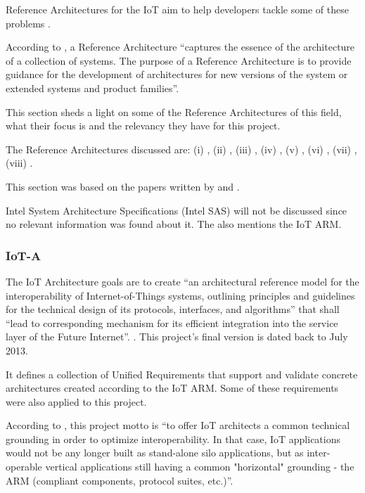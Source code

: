 Reference Architectures for the \gls{IoT} aim to help developers tackle some of these problems \parencite{weyrich2015reference}.

According to \cite{muller2008reference}, a Reference Architecture ``captures the essence of the architecture of a collection of systems. The purpose of a Reference Architecture is to provide guidance for the development of architectures for new versions of the system or extended systems and product families''.

This section sheds a light on some of the Reference Architectures of this field, what their focus is and the relevancy they have for this project.

The Reference Architectures discussed are: (i) , (ii) , (iii) , (iv) , (v) , (vi) , (vii) , (viii) .

This section was based on the papers written by \cite{Lynn2020} and \cite{DIAS2022100529}.

Intel System Architecture Specifications (Intel SAS) will not be discussed since no relevant information was found about it.
The  also mentions the \gls{IoT} \gls{ARM}.

\subsubsection{IoT-A}
\label{subsubsec:stateofart:arch:iota}

The IoT Architecture goals are to create ``an architectural reference model for the interoperability of Internet-of-Things systems, outlining principles and guidelines for the technical design of its protocols, interfaces, and algorithms'' that shall ``lead to corresponding mechanism for its efficient integration into the service layer of the Future Internet''. \parencite{iot-a}. This project's final version is dated back to July 2013.

It defines a collection of Unified Requirements that support and validate concrete architectures created according to the \gls{IoT} \gls{ARM}. Some of these requirements were also applied to this project.

According to \cite{krvco2014designing}, this project motto is ``to offer IoT architects a common technical grounding in order to optimize interoperability. In that case, IoT applications would not be any longer built as stand-alone silo applications, but as inter-operable vertical applications still having a common "horizontal" grounding - the \gls{ARM} (compliant components, protocol suites, etc.)''.

